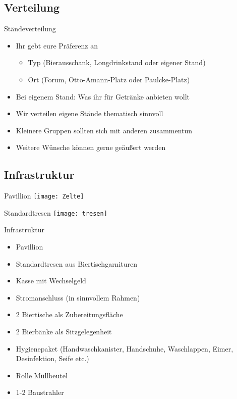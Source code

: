 \subsection{Verteilung}

\begin{frame}[c]{Ständeverteilung}
    \begin{itemize}[<+(1)->]
        \item Ihr gebt eure Präferenz an 
            \begin{itemize}[<+(1)->]
                \item Typ (Bierausschank, Longdrinkstand oder eigener Stand)
                \item Ort (Forum, Otto-Amann-Platz oder Paulcke-Platz)
            \end{itemize}
        \item Bei eigenem Stand: Was ihr für Getränke anbieten wollt
        \item Wir verteilen eigene Stände thematisch sinnvoll
        \item Kleinere Gruppen sollten sich mit anderen zusammentun
        \item Weitere Wünsche können gerne geäußert werden
    \end{itemize}
\end{frame}



\subsection{Infrastruktur}

\begin{frame}[c]{Pavillion}
    \texttt{[image: Zelte]}
\end{frame}


\begin{frame}[c]{Standardtresen}
    \texttt{[image: tresen]}
\end{frame}


\begin{frame}[c]{Infrastruktur}
    \begin{itemize}
        \item Pavillion
        \item Standardtresen aus Biertischgarnituren
        \item Kasse mit Wechselgeld
        \item Stromanschluss (in sinnvollem Rahmen)
        \item 2 Biertische als Zubereitungsfläche
        \item 2 Bierbänke als Sitzgelegenheit
        \item Hygienepaket (Handwaschkanister, Handschuhe, Waschlappen, Eimer, Desinfektion, Seife etc.)
        \item Rolle Müllbeutel
        \item 1-2 Baustrahler %
    \end{itemize}
\end{frame}



